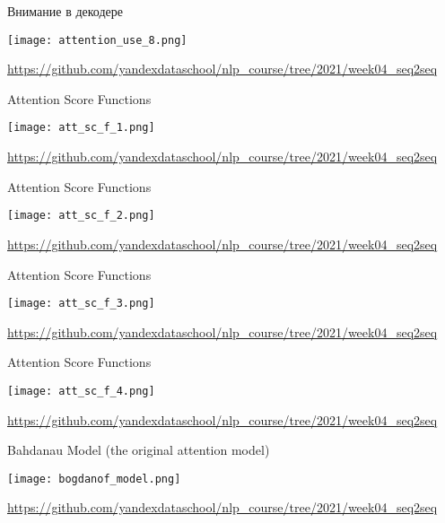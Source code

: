 \documentclass[notes,12pt, aspectratio=169]{beamer}
\begin{document}
\begin{frame}{Внимание в декодере}
	\begin{center}
		\texttt{[image: attention\_use\_8.png]}
	\end{center}
	\vfill
	\footnotesize  {\color{blue} \url{https://github.com/yandexdataschool/nlp_course/tree/2021/week04_seq2seq}} 
\end{frame} 




\begin{frame}{Attention Score Functions}
	\begin{center}
		\texttt{[image: att\_sc\_f\_1.png]}
	\end{center}
	\vfill
	\footnotesize  {\color{blue} \url{https://github.com/yandexdataschool/nlp_course/tree/2021/week04_seq2seq}} 
\end{frame} 

\begin{frame}{Attention Score Functions}
	\begin{center}
		\texttt{[image: att\_sc\_f\_2.png]}
	\end{center}
	\vfill
	\footnotesize  {\color{blue} \url{https://github.com/yandexdataschool/nlp_course/tree/2021/week04_seq2seq}} 
\end{frame} 

\begin{frame}{Attention Score Functions}
	\begin{center}
		\texttt{[image: att\_sc\_f\_3.png]}
	\end{center}
	\vfill
	\footnotesize  {\color{blue} \url{https://github.com/yandexdataschool/nlp_course/tree/2021/week04_seq2seq}} 
\end{frame} 

\begin{frame}{Attention Score Functions}
	\begin{center}
		\texttt{[image: att\_sc\_f\_4.png]}
	\end{center}
	\vfill
	\footnotesize  {\color{blue} \url{https://github.com/yandexdataschool/nlp_course/tree/2021/week04_seq2seq}} 
\end{frame} 




\begin{frame}{Bahdanau Model (the original attention model)}
	\begin{center}
		\texttt{[image: bogdanof\_model.png]}
	\end{center}
	\vfill
	\footnotesize  {\color{blue} \url{https://github.com/yandexdataschool/nlp_course/tree/2021/week04_seq2seq}} 
\end{frame} 
\end{document}
